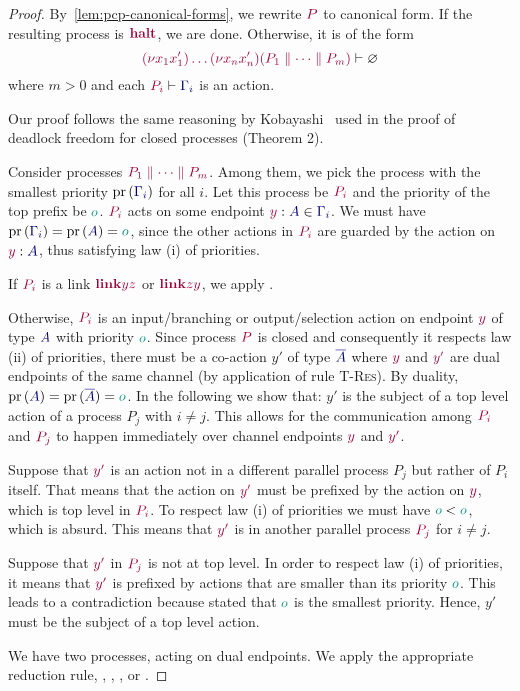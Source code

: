 \begin{proof}
  \label{prf:thm-pcp-closed-progress}
  By~\cref{lem:pcp-canonical-forms}, we rewrite $\tm{P}$ to canonical form. If the resulting process is $\tm{\halt}$, we are done. Otherwise, it is of the form
  \[
    \seq{\res{x_1}{x'_1}{\dots\res{x_n}{x'_n}{(P_1 \parallel\dots\parallel P_m)}}}{\emptyenv}
  \]
  where $m>0$ and each $\seq{P_i}{\ty{\Gamma_i}}$ is an action.

  Our proof follows the same reasoning by Kobayashi~\cite{kobayashi06} used in the proof of deadlock freedom for closed processes (Theorem 2).

  Consider processes $\tm {P_1 \parallel\dots\parallel P_m}$. Among them, we pick the process with the smallest priority $\minpr{(\ty{\Gamma_i})}$ for all $i$. Let this process be $\tm{P_i}$ and the priority of the top prefix be $\cs o$. $\tm{P_i}$ acts on some endpoint $\tmty{y}{A}\in\ty{\Gamma_i}$. We must have $\minpr{(\ty{\Gamma_i})}=\pr{(\ty{A})} = \cs o$, since the other actions in $\tm{P_i}$ are guarded by the action on $\tmty{y}{A}$, thus satisfying law (i) of priorities.

  If $\tm{P_i}$ is a link $\tm{\link{y}{z}}$ or $\tm{\link{z}{y}}$, we apply .

  Otherwise, $\tm{P_i}$ is an input/branching or output/selection action on endpoint $\tm y$ of type $\ty A$ with priority $\cs o$. Since process $\tm P$ is closed and consequently it respects law (ii) of priorities, there must be a co-action $y'$ of type $\ty{\co{A}}$  where $\tm{y}$ and $\tm{y'}$ are dual endpoints of the same channel (by application of rule \textsc{T-Res}). By duality, $\pr{(\ty{A})}=\pr{(\ty{\co{A}})}= \cs o$. In the following we show that: $y'$ is the subject of a top level action of a process $P_j$ with $i\neq j$. This allows for the communication among $\tm{P_i}$ and $\tm{P_j}$ to happen immediately over channel endpoints $\tm{y}$ and $\tm{y'}$.

  Suppose that $\tm{y'}$ is an action not in a different parallel process $P_j$ but rather of $P_i$ itself. That means that the action on $\tm{y'}$ must be prefixed by the action on $\tm{y}$, which is top level in $\tm{P_i}$. To respect law (i) of priorities we must have $\cs o < \cs o$, which is absurd. This means that $\tm{y'}$ is in another parallel process $\tm{P_j}$ for $i\neq j$.

  Suppose that $\tm{y'}$ in $\tm{P_j}$ is not at top level. In order to respect law (i) of priorities, it means that $\tm{y'}$ is prefixed by actions that are smaller than its priority $\cs o$. This leads to a contradiction because stated that $\cs o$ is the smallest priority. Hence, $y'$ must be the subject of a top level action.

  We have two processes, acting on dual endpoints. We apply the appropriate reduction rule, \ie {}, , , or .
\end{proof}

